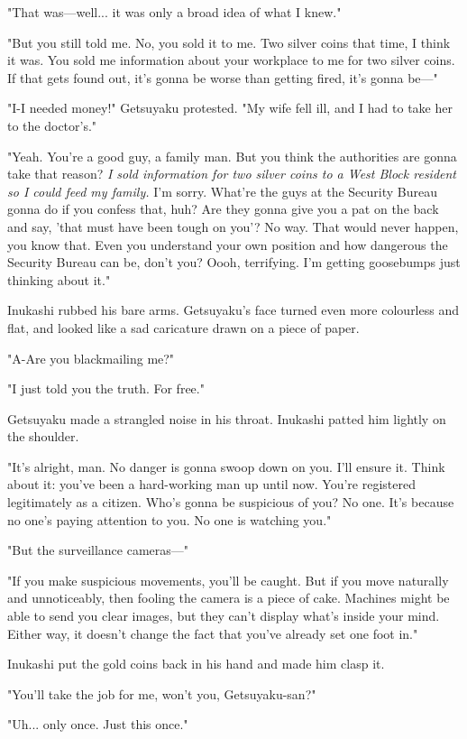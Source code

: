 "That was---well... it was only a broad idea of what I knew."

"But you still told me. No, you sold it to me. Two silver coins that
time, I think it was. You sold me information about your workplace to me
for two silver coins. If that gets found out, it's gonna be worse than
getting fired, it's gonna be---"

"I-I needed money!" Getsuyaku protested. "My wife fell ill, and I had to
take her to the doctor's."

"Yeah. You're a good guy, a family man. But you think the authorities
are gonna take that reason? \emph{I sold information for two silver coins to a
West Block resident so I could feed my family.} I'm sorry. What're the
guys at the Security Bureau gonna do if you confess that, huh? Are they
gonna give you a pat on the back and say, 'that must have been tough on
you'? No way. That would never happen, you know that. Even you
understand your own position and how dangerous the Security Bureau can
be, don't you? Oooh, terrifying. I'm getting goosebumps just thinking
about it."

Inukashi rubbed his bare arms. Getsuyaku's face turned even more
colourless and flat, and looked like a sad caricature drawn on a piece
of paper.

"A-Are you blackmailing me?"

"I just told you the truth. For free."

Getsuyaku made a strangled noise in his throat. Inukashi patted him
lightly on the shoulder.

"It's alright, man. No danger is gonna swoop down on you. I'll ensure
it. Think about it: you've been a hard-working man up until now. You're
registered legitimately as a citizen. Who's gonna be suspicious of you?
No one. It's because no one's paying attention to you. No one is
watching you."

"But the surveillance cameras---"

"If you make suspicious movements, you'll be caught. But if you move
naturally and unnoticeably, then fooling the camera is a piece of cake.
Machines might be able to send you clear images, but they can't display
what's inside your mind. Either way, it doesn't change the fact that
you've already set one foot in."

Inukashi put the gold coins back in his hand and made him clasp it.

"You'll take the job for me, won't you, Getsuyaku-san?"

"Uh... only once. Just this once."


